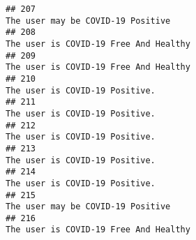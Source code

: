 \documentclass[
]{article}
\begin{document}
\begin{verbatim}
## 207                                                                                                                                                                                                                                  The user may be COVID-19 Positive
## 208                                                                                                                                                                                                                              The user is COVID-19 Free And Healthy
## 209                                                                                                                                                                                                                              The user is COVID-19 Free And Healthy
## 210                                                                                                                                                                                                                                     The user is COVID-19 Positive.
## 211                                                                                                                                                                                                                                     The user is COVID-19 Positive.
## 212                                                                                                                                                                                                                                     The user is COVID-19 Positive.
## 213                                                                                                                                                                                                                                     The user is COVID-19 Positive.
## 214                                                                                                                                                                                                                                     The user is COVID-19 Positive.
## 215                                                                                                                                                                                                                                  The user may be COVID-19 Positive
## 216                                                                                                                                                                                                                              The user is COVID-19 Free And Healthy

\end{verbatim}
\end{document}
